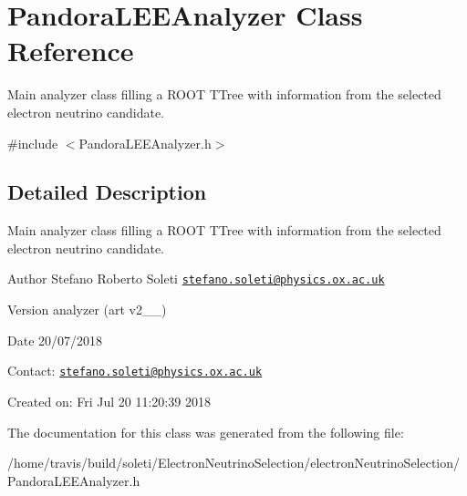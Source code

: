 \hypertarget{classPandoraLEEAnalyzer}{\section{Pandora\-L\-E\-E\-Analyzer Class Reference}
\label{classPandoraLEEAnalyzer}
}


Main analyzer class filling a R\-O\-O\-T T\-Tree with information from the selected electron neutrino candidate.  




{\ttfamily \#include $<$Pandora\-L\-E\-E\-Analyzer.\-h$>$}



\subsection{Detailed Description}
Main analyzer class filling a R\-O\-O\-T T\-Tree with information from the selected electron neutrino candidate. 

\begin{DoxyAuthor}{Author}
Stefano Roberto Soleti \href{mailto:stefano.soleti@physics.ox.ac.uk}{\tt stefano.\-soleti@physics.\-ox.\-ac.\-uk}
\end{DoxyAuthor}
\begin{DoxyVersion}{Version}
analyzer (art v2\-\_\-\_)
\end{DoxyVersion}
\begin{DoxyDate}{Date}
20/07/2018
\end{DoxyDate}
Contact\-: \href{mailto:stefano.soleti@physics.ox.ac.uk}{\tt stefano.\-soleti@physics.\-ox.\-ac.\-uk}

Created on\-: Fri Jul 20 11\-:20\-:39 2018 

The documentation for this class was generated from the following file\-:\begin{DoxyCompactItemize}
\item 
/home/travis/build/soleti/\-Electron\-Neutrino\-Selection/electron\-Neutrino\-Selection/Pandora\-L\-E\-E\-Analyzer.\-h\end{DoxyCompactItemize}
